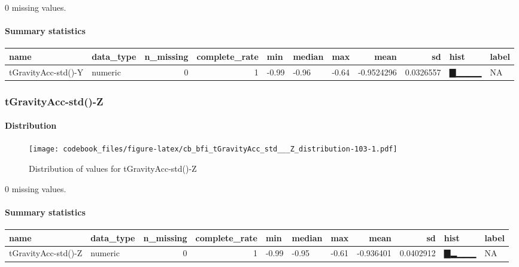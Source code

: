\documentclass[
]{article}
\begin{document}
0 missing values.

\hypertarget{tGravityAcc_std___Y_summary}{%
\paragraph{Summary statistics}\label{tGravityAcc_std___Y_summary}}

\begin{longtable}[]{@{}llrrlllrrll@{}}
\toprule
name & data\_type & n\_missing & complete\_rate & min & median & max &
mean & sd & hist & label \\
\midrule
\endhead
tGravityAcc-std()-Y & numeric & 0 & 1 & -0.99 & -0.96 & -0.64 &
-0.9524296 & 0.0326557 & ▇▁▁▁▁ & NA \\
\bottomrule
\end{longtable}

\hypertarget{tGravityAcc_std___Z}{%
\subsubsection{tGravityAcc-std()-Z}\label{tGravityAcc_std___Z}}

\hypertarget{tGravityAcc_std___Z_distribution}{%
\paragraph{Distribution}\label{tGravityAcc_std___Z_distribution}}

\begin{figure}
\centering
\texttt{[image: codebook\_files/figure-latex/cb\_bfi\_tGravityAcc\_std\_\_\_Z\_distribution-103-1.pdf]}
\caption{Distribution of values for tGravityAcc-std()-Z}
\end{figure}

0 missing values.

\hypertarget{tGravityAcc_std___Z_summary}{%
\paragraph{Summary statistics}\label{tGravityAcc_std___Z_summary}}

\begin{longtable}[]{@{}llrrlllrrll@{}}
\toprule
name & data\_type & n\_missing & complete\_rate & min & median & max &
mean & sd & hist & label \\
\midrule
\endhead
tGravityAcc-std()-Z & numeric & 0 & 1 & -0.99 & -0.95 & -0.61 &
-0.936401 & 0.0402912 & ▇▂▁▁▁ & NA \\
\bottomrule
\end{longtable}
\end{document}
